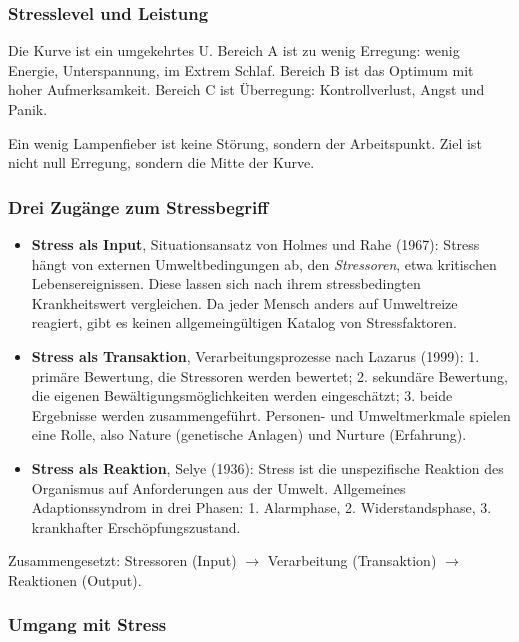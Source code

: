 \documentclass[12pt, a4paper]{article}
\begin{document}
\subsubsection{Stresslevel und Leistung}

Die Kurve ist ein umgekehrtes U. Bereich A ist zu wenig Erregung: wenig
Energie, Unterspannung, im Extrem Schlaf. Bereich B ist das Optimum mit hoher
Aufmerksamkeit. Bereich C ist Überregung: Kontrollverlust, Angst und Panik.

\begin{notebox}
Ein wenig Lampenfieber ist keine Störung, sondern der Arbeitspunkt. Ziel ist
nicht null Erregung, sondern die Mitte der Kurve.
\end{notebox}

\subsubsection{Drei Zugänge zum Stressbegriff}

\begin{itemize}
  \item \textbf{Stress als Input}, Situationsansatz von Holmes und Rahe
        (1967): Stress hängt von externen Umweltbedingungen ab, den
        \emph{Stressoren}, etwa kritischen Lebensereignissen. Diese lassen
        sich nach ihrem stressbedingten Krankheitswert vergleichen. Da jeder
        Mensch anders auf Umweltreize reagiert, gibt es keinen
        allgemeingültigen Katalog von Stressfaktoren.
  \item \textbf{Stress als Transaktion}, Verarbeitungsprozesse nach Lazarus
        (1999): 1. primäre Bewertung, die Stressoren werden bewertet;
        2. sekundäre Bewertung, die eigenen Bewältigungsmöglichkeiten werden
        eingeschätzt; 3. beide Ergebnisse werden zusammengeführt. Personen-
        und Umweltmerkmale spielen eine Rolle, also Nature (genetische
        Anlagen) und Nurture (Erfahrung).
  \item \textbf{Stress als Reaktion}, Selye (1936): Stress ist die
        unspezifische Reaktion des Organismus auf Anforderungen aus der
        Umwelt. Allgemeines Adaptionssyndrom in drei Phasen: 1. Alarmphase,
        2. Widerstandsphase, 3. krankhafter Erschöpfungszustand.
\end{itemize}

Zusammengesetzt: Stressoren (Input) $\rightarrow$ Verarbeitung (Transaktion)
$\rightarrow$ Reaktionen (Output).

\subsubsection{Umgang mit Stress}
\end{document}
